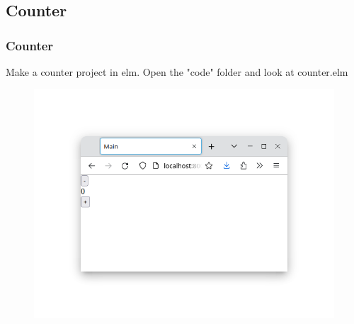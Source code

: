 \subsection{Counter}
    \begin{frame}
        \frametitle{Counter}
        Make a counter project in elm.
        Open the "code" folder and look at counter.elm
        \begin{figure}
            \includegraphics[scale=0.25]{counter}
            \end{figure}
    \end{frame}